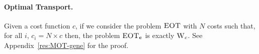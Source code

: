 \paragraph{Optimal Transport.} Given a cost function $c$, if we consider the problem $\textsc{EOT}$ with $N$ costs such that, for all $i$, $c_i=N\times c$ then, the problem $\textsc{EOT}_\mathbf{c}$ is exactly $\textsc{W}_c$. See Appendix~\ref{res:MOT-gene} for the proof.


